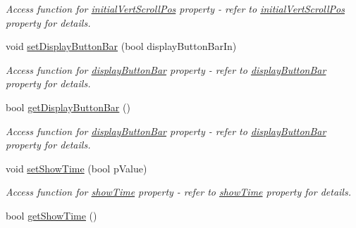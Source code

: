\begin{DoxyCompactItemize}
\begin{DoxyCompactList}\small\item\em Access function for \hyperlink{classQEImage_af4af8618263670a539f5f42f69378256}{initialVertScrollPos} property -\/ refer to \hyperlink{classQEImage_af4af8618263670a539f5f42f69378256}{initialVertScrollPos} property for details. \end{DoxyCompactList}\item 
\hypertarget{classQEImage_a7dfe2066bb4ded779074fccc02faf23e}{
void \hyperlink{classQEImage_a7dfe2066bb4ded779074fccc02faf23e}{setDisplayButtonBar} (bool displayButtonBarIn)}
\label{classQEImage_a7dfe2066bb4ded779074fccc02faf23e}

\begin{DoxyCompactList}\small\item\em Access function for \hyperlink{classQEImage_a5d25b289ae57a8848e13816c62def90a}{displayButtonBar} property -\/ refer to \hyperlink{classQEImage_a5d25b289ae57a8848e13816c62def90a}{displayButtonBar} property for details. \end{DoxyCompactList}\item 
\hypertarget{classQEImage_a754aa42d4b111605e3b87c9fce902d45}{
bool \hyperlink{classQEImage_a754aa42d4b111605e3b87c9fce902d45}{getDisplayButtonBar} ()}
\label{classQEImage_a754aa42d4b111605e3b87c9fce902d45}

\begin{DoxyCompactList}\small\item\em Access function for \hyperlink{classQEImage_a5d25b289ae57a8848e13816c62def90a}{displayButtonBar} property -\/ refer to \hyperlink{classQEImage_a5d25b289ae57a8848e13816c62def90a}{displayButtonBar} property for details. \end{DoxyCompactList}\item 
\hypertarget{classQEImage_a712b92f21d199f941d5e50b5de41e4e1}{
void \hyperlink{classQEImage_a712b92f21d199f941d5e50b5de41e4e1}{setShowTime} (bool pValue)}
\label{classQEImage_a712b92f21d199f941d5e50b5de41e4e1}

\begin{DoxyCompactList}\small\item\em Access function for \hyperlink{classQEImage_a51abf900097601e100eb03060ca173dc}{showTime} property -\/ refer to \hyperlink{classQEImage_a51abf900097601e100eb03060ca173dc}{showTime} property for details. \end{DoxyCompactList}\item 
\hypertarget{classQEImage_a0362f9dd4a7e79fea74d352a9e3edd47}{
bool \hyperlink{classQEImage_a0362f9dd4a7e79fea74d352a9e3edd47}{getShowTime} ()}
\label{classQEImage_a0362f9dd4a7e79fea74d352a9e3edd47}


\end{DoxyCompactItemize}
